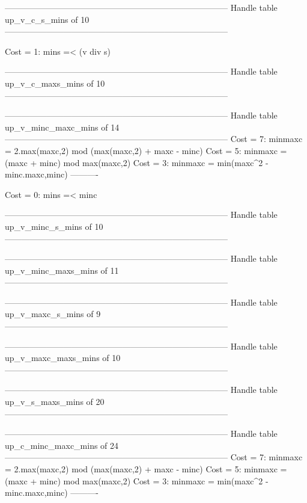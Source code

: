 --------------------------------------------------------------------------------
Handle table up_v_c_s_mins of 10
--------------------------------------------------------------------------------

Cost =  1:  mins =< (v div s)

--------------------------------------------------------------------------------
Handle table up_v_c_maxs_mins of 10
--------------------------------------------------------------------------------


--------------------------------------------------------------------------------
Handle table up_v_minc_maxc_mins of 14
--------------------------------------------------------------------------------
Cost =  7:  minmaxc = 2.max(maxc,2) mod (max(maxc,2) + maxc - minc)
Cost =  5:  minmaxc = (maxc + minc) mod max(maxc,2)
Cost =  3:  minmaxc = min(maxc^2 - minc.maxc,minc)
----------

Cost =  0:  mins =< minc

--------------------------------------------------------------------------------
Handle table up_v_minc_s_mins of 10
--------------------------------------------------------------------------------


--------------------------------------------------------------------------------
Handle table up_v_minc_maxs_mins of 11
--------------------------------------------------------------------------------


--------------------------------------------------------------------------------
Handle table up_v_maxc_s_mins of 9
--------------------------------------------------------------------------------


--------------------------------------------------------------------------------
Handle table up_v_maxc_maxs_mins of 10
--------------------------------------------------------------------------------


--------------------------------------------------------------------------------
Handle table up_v_s_maxs_mins of 20
--------------------------------------------------------------------------------


--------------------------------------------------------------------------------
Handle table up_c_minc_maxc_mins of 24
--------------------------------------------------------------------------------
Cost =  7:  minmaxc = 2.max(maxc,2) mod (max(maxc,2) + maxc - minc)
Cost =  5:  minmaxc = (maxc + minc) mod max(maxc,2)
Cost =  3:  minmaxc = min(maxc^2 - minc.maxc,minc)
----------

